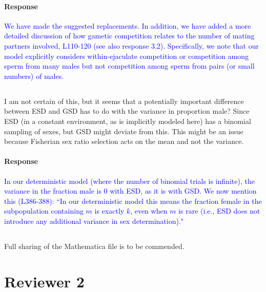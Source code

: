 \documentclass[10pt,letterpaper]{article}
\begin{document}
\noindent\paragraph{Response}
\textcolor{blue}{We have made the suggested replacements.
In addition, we have added a more detailed discussion of how gametic competition relates to the number of mating partners involved, L110-120 (see also response 3.2). 
Specifically, we note that our model explicitly considers within-ejaculate competition or competition among sperm from many males but not competition among sperm from pairs (or small numbers) of males. 
}

\noindent\subsection{}
I am not certain of this, but it seems that a potentially important difference between ESD and GSD has to do with the variance in proportion male? Since ESD (in a constant environment, as is implicitly modeled here) has a binomial sampling of sexes, but GSD might deviate from this.  This might be an issue because Fisherian sex ratio selection acts on the mean and not the variance.

\noindent\paragraph{Response}
\textcolor{blue}{In our deterministic model (where the number of binomial trials is infinite), the variance in the fraction male is 0 with ESD, as it is with GSD. 
We now mention this (L386-388): ``In our deterministic model this means the fraction female in the subpopulation containing $m$ is exactly $k$, even when $m$ is rare (i.e., ESD does not introduce any additional variance in sex determination)." 
 }

\noindent\subsection{}
Full sharing of the Mathematica file is to be commended.

\section{Reviewer 2}
\end{document}

